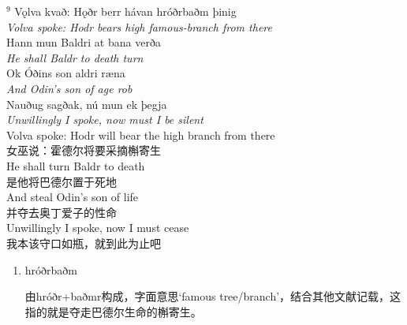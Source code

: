 \begin{paracol}{2}
  \noindent
  $^9$ Vǫlva kvað: Hǫðr berr hávan hróðrbaðm þinig\\
  \textit{Volva spoke: Hodr bears high famous-branch from there}\\
  Hann mun Baldri at bana verða\\
  \textit{He shall Baldr to death turn}\\
  Ok Óðins son aldri ræna\\
  \textit{And Odin's son of age rob}\\
  Nauðug sagðak, nú mun ek þegja\\
  \textit{Unwillingly I spoke, now must I be silent}\\
  \switchcolumn
  \noindent
  Volva spoke: Hodr will bear the high branch from there\\
  女巫说：霍德尔将要采摘槲寄生\\
  He shall turn Baldr to death\\
  是他将巴德尔置于死地\\
  And steal Odin's son of life\\
  并夺去奥丁爱子的性命\\
  Unwillingly I spoke, now I must cease\\
  我本该守口如瓶，就到此为止吧
\end{paracol}
\begin{grammar*}{}
  \begin{enumerate}[leftmargin=*]
    \item hróðrbaðm

          由hróðr+baðmr构成，字面意思`famous tree/branch'，结合其他文献记载，这指的就是夺走巴德尔生命的槲寄生。
  \end{enumerate}
\end{grammar*}

